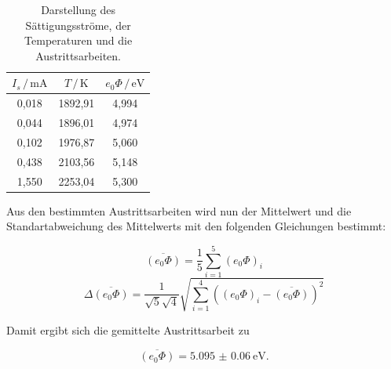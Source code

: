 \begin{table}[H]
  \centering
  \caption{Darstellung des Sättigungsströme, der Temperaturen und die Austrittsarbeiten.}
  \label{tab:5}
  \begin{tabular}{c c c}
    \toprule
    $I_s \, / \, \si{\milli\ampere}$ & $T \, / \, \si{\kelvin}$ & $e_0 \Phi \, / \, \si{\eV}$ \\
    \midrule
    0,018 & 1892,91 & 4,994 \\
    0,044 & 1896,01 & 4,974 \\
    0,102 & 1976,87 & 5,060 \\
    0,438 & 2103,56 & 5,148 \\
    1,550 & 2253,04 & 5,300 \\
    \bottomrule
  \end{tabular}
\end{table}

Aus den bestimmten Austrittsarbeiten wird nun der Mittelwert und die Standartabweichung
des Mittelwerts mit den folgenden Gleichungen bestimmt:

\begin{equation*}
    \overline{(e_0\Phi)} = \frac{1}{5} \sum_{i=1}^{5} (e_0\Phi)_i
\end{equation*}
\begin{equation*}
  \Delta \overline{(e_0\Phi)} = \frac{1}{\sqrt{5}\sqrt{4}} \sqrt{\sum_{i=1}^{4}\left((e_0\Phi)_i-\overline{(e_0\Phi)}\right)^2}
\end{equation*}


Damit ergibt sich die gemittelte Austrittsarbeit zu

\begin{equation*}
  \overline{(e_0\Phi)} = \SI{5.095(60)}{\eV}.
\end{equation*}
